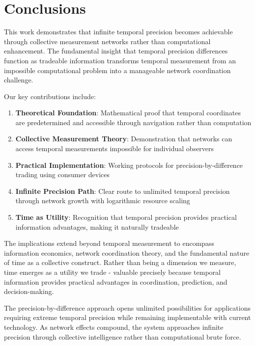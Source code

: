\documentclass[12pt,a4paper]{article}
\begin{document}
\section{Conclusions}

This work demonstrates that infinite temporal precision becomes achievable through collective measurement networks rather than computational enhancement. The fundamental insight that temporal precision differences function as tradeable information transforms temporal measurement from an impossible computational problem into a manageable network coordination challenge.

Our key contributions include:

\begin{enumerate}
\item \textbf{Theoretical Foundation}: Mathematical proof that temporal coordinates are predetermined and accessible through navigation rather than computation

\item \textbf{Collective Measurement Theory}: Demonstration that networks can access temporal measurements impossible for individual observers

\item \textbf{Practical Implementation}: Working protocols for precision-by-difference trading using consumer devices

\item \textbf{Infinite Precision Path}: Clear route to unlimited temporal precision through network growth with logarithmic resource scaling

\item \textbf{Time as Utility}: Recognition that temporal precision provides practical information advantages, making it naturally tradeable
\end{enumerate}

The implications extend beyond temporal measurement to encompass information economics, network coordination theory, and the fundamental nature of time as a collective construct. Rather than being a dimension we measure, time emerges as a utility we trade - valuable precisely because temporal information provides practical advantages in coordination, prediction, and decision-making.

The precision-by-difference approach opens unlimited possibilities for applications requiring extreme temporal precision while remaining implementable with current technology. As network effects compound, the system approaches infinite precision through collective intelligence rather than computational brute force.
\end{document}
